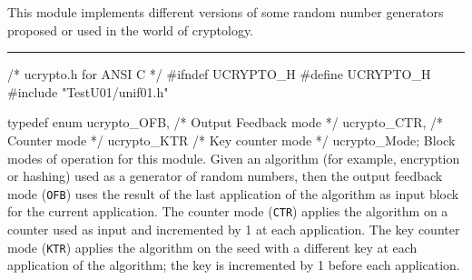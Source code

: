 
This module implements different versions of some random number generators
proposed or used in the world of cryptology.

\newcommand{\aes}{\textrm{AES}}
\newcommand{\shaun}{\mbox{\textrm{SHA-1}}}
\newcommand{\calh}{{H}}
\newcommand{\cale}{{E}}


\bigskip
\hrule
\code\hide
/*  ucrypto.h  for ANSI C  */
#ifndef UCRYPTO_H
#define UCRYPTO_H
\endhide
#include "TestU01/unif01.h"


typedef enum {
   ucrypto_OFB,                 /* Output Feedback mode */
   ucrypto_CTR,                 /* Counter mode */
   ucrypto_KTR                  /* Key counter mode */
   } ucrypto_Mode;
\endcode
 \tab  Block modes of operation \cite{rDWO01a} for this module. Given an algorithm
  (for example, encryption or hashing) used as a generator of random numbers, then
  the output feedback mode (\texttt{OFB}) uses the result of the last application
  of the algorithm as input block for the current application. The counter 
   mode (\texttt{CTR}) applies the algorithm on a counter used as input and 
  incremented by 1 at each application.  The key counter mode (\texttt{KTR}) 
  applies the algorithm on the seed with a different key at each application of
  the algorithm; the key is incremented by 1 before each application.   
 \endtab
\code


